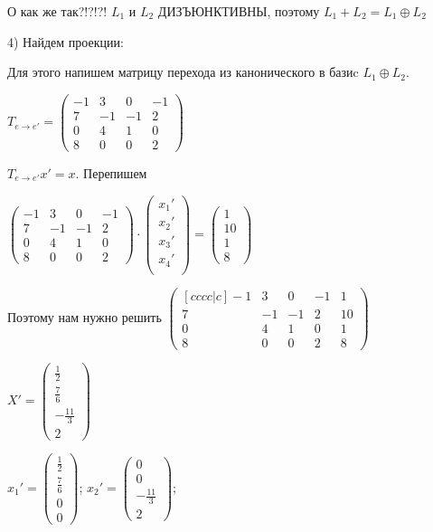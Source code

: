 \documentclass{article}
\begin{document}
О как же так?!?!?! $L_1$ и $L_2$ ДИЗЪЮНКТИВНЫ, поэтому $L_1 + L_2 = L_1 \oplus L_2$ 

4) Найдем проекции:

Для этого напишем матрицу перехода из канонического в базиc $L_1 \oplus L_2$.

$T_{e \rightarrow e'} = \begin{pmatrix}
    -1 & 3 & 0 & -1 \\
    7 & -1 & -1 & 2 \\
    0 & 4 & 1 & 0 \\
    8 & 0 & 0 & 2
\end{pmatrix}$

$T_{e \rightarrow e'} x' = x$. Перепишем

$\begin{pmatrix}
    -1 & 3 & 0 & -1 \\
    7 & -1 & -1 & 2 \\
    0 & 4 & 1 & 0 \\
    8 & 0 & 0 & 2
\end{pmatrix} \cdot \begin{pmatrix}
    x_1' \\
    x_2' \\
    x_3' \\
    x_4' \\
\end{pmatrix} = \begin{pmatrix}
    1 \\
    10 \\
    1 \\
    8
\end{pmatrix}$

Поэтому нам нужно решить $\begin{pmatrix}[cccc|c]
    -1 & 3 & 0 & -1  & 1\\
    7 & -1 & -1 & 2  & 10\\
    0 & 4 & 1 & 0 & 1\\
    8 & 0 & 0 & 2 & 8
\end{pmatrix}$

$X' = \begin{pmatrix}
    \frac{1}{2}\\
    \frac{7}{6}\\
    -\frac{11}{3}\\
    2
\end{pmatrix}$

$x_1' =  \begin{pmatrix}
    \frac{1}{2}\\
    \frac{7}{6}\\
    0\\
    0
\end{pmatrix}$; 
$x_2' =\begin{pmatrix}
    0\\
    0\\
    -\frac{11}{3}\\
    2
\end{pmatrix}$;
\end{document}
